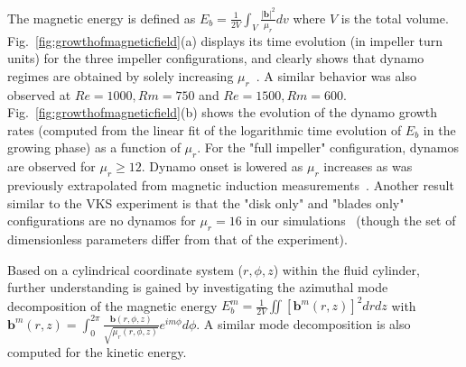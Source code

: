 \documentclass[aps,prl,twocolumn,showpacs,amsmath,amssymb]{revtex4-1}%
\begin{document}
The magnetic energy is defined as \mbox{$E_b=\displaystyle\frac{1}{2V} \int_V \displaystyle\frac{|\mathbf{b}|^2}{\mu_r} dv$} where $V$ is the total volume. Fig.~\ref{fig:growthofmagneticfield}(a) displays its time evolution (in impeller turn units) for the three impeller configurations, and clearly shows that dynamo regimes are obtained by solely increasing  $\mu_r$~\cite{paper:gissinger:2008.1,paper:giesecke:2010,nore_direct_2016}. A similar behavior was also observed at $Re=1000, Rm=750$ and $Re=1500, Rm=600$. 
Fig.~\ref{fig:growthofmagneticfield}(b) shows the evolution of the dynamo growth rates 
(computed from the linear fit of the logarithmic time evolution of $E_b$ in the growing phase) 
as a function of $\mu_r$. For the "full impeller" configuration, dynamos are observed for $\mu_r \geq 12$.  Dynamo onset is lowered as $\mu_r$ increases as was previously extrapolated from magnetic induction measurements~\cite{paper:verhille:2010,paper:miralles:2013}.  
Another result similar to the VKS experiment is that the "disk only" and "blades only" configurations are no dynamos for $\mu_r = 16$ in our simulations~\cite{paper:miralles:2013} 
(though the set of dimensionless parameters differ from that of the experiment).

Based on a cylindrical coordinate system ($r,\phi,z$) within the fluid cylinder, further understanding is gained by investigating the azimuthal mode decomposition of the magnetic energy \mbox{$E_b^m = \displaystyle\frac{1}{2V} \iint \left[\mathbf{b}^m(r,z)\right]^2dr dz$}
with \mbox{$\mathbf{b}^m(r,z) = \displaystyle\int_0^{2\pi}\displaystyle\frac{\mathbf{b}(r,\phi,z)}{\sqrt{\mu_r(r,\phi,z)}}e^{i m\phi} d\phi$}. 
A similar mode decomposition is also computed for the kinetic energy.
 
\end{document}
